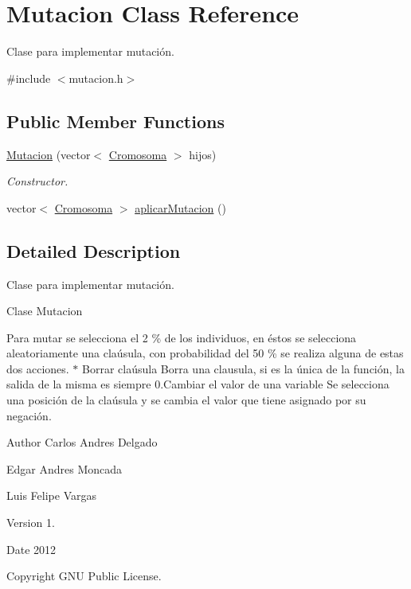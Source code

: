 \hypertarget{classMutacion}{\section{Mutacion Class Reference}
\label{classMutacion}
}


Clase para implementar mutación.  




{\ttfamily \#include $<$mutacion.\-h$>$}

\subsection*{Public Member Functions}
\begin{DoxyCompactItemize}
\item 
\hyperlink{classMutacion_afee3c90f0afc795c89fa0590bef2b667}{Mutacion} (vector$<$ \hyperlink{classCromosoma}{Cromosoma} $>$ hijos)
\begin{DoxyCompactList}\small\item\em Constructor. \end{DoxyCompactList}\item 
vector$<$ \hyperlink{classCromosoma}{Cromosoma} $>$ \hyperlink{classMutacion_a6ef8eb8c3818175895cf7ff56cdfedf0}{aplicar\-Mutacion} ()
\end{DoxyCompactItemize}


\subsection{Detailed Description}
Clase para implementar mutación. 

\begin{DoxyVerb}Clase Mutacion
\end{DoxyVerb}


Para mutar se selecciona el 2 \% de los individuos, en éstos se selecciona aleatoriamente una claúsula, con probabilidad del 50 \% se realiza alguna de estas dos acciones. $\ast$ Borrar claúsula Borra una clausula, si es la única de la función, la salida de la misma es siempre 0.\-Cambiar el valor de una variable Se selecciona una posición de la claúsula y se cambia el valor que tiene asignado por su negación. \begin{DoxyAuthor}{Author}
Carlos Andres Delgado 

Edgar Andres Moncada 

Luis Felipe Vargas 
\end{DoxyAuthor}
\begin{DoxyVersion}{Version}
1. 
\end{DoxyVersion}
\begin{DoxyDate}{Date}
2012 
\end{DoxyDate}
\begin{DoxyCopyright}{Copyright}
G\-N\-U Public License. 
\end{DoxyCopyright}


